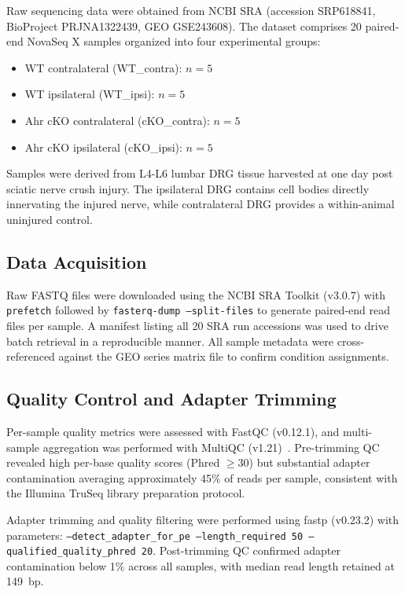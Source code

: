 \documentclass[conference]{IEEEtran}
\begin{document}
Raw sequencing data were obtained from NCBI SRA (accession SRP618841, BioProject PRJNA1322439, GEO GSE243608). The dataset comprises 20 paired-end NovaSeq X samples organized into four experimental groups:

\begin{itemize}
  \item WT contralateral (WT\_contra): $n = 5$
  \item WT ipsilateral (WT\_ipsi): $n = 5$
  \item Ahr cKO contralateral (cKO\_contra): $n = 5$
  \item Ahr cKO ipsilateral (cKO\_ipsi): $n = 5$
\end{itemize}

Samples were derived from L4-L6 lumbar DRG tissue harvested at one day post sciatic nerve crush injury. The ipsilateral DRG contains cell bodies directly innervating the injured nerve, while contralateral DRG provides a within-animal uninjured control.

\subsection{Data Acquisition}

Raw FASTQ files were downloaded using the NCBI SRA Toolkit (v3.0.7) with \texttt{prefetch} followed by \texttt{fasterq-dump --split-files} to generate paired-end read files per sample. A manifest listing all 20 SRA run accessions was used to drive batch retrieval in a reproducible manner. All sample metadata were cross-referenced against the GEO series matrix file to confirm condition assignments.

\subsection{Quality Control and Adapter Trimming}

Per-sample quality metrics were assessed with FastQC (v0.12.1), and multi-sample aggregation was performed with MultiQC (v1.21)~\cite{ewels2016}. Pre-trimming QC revealed high per-base quality scores (Phred $\geq 30$) but substantial adapter contamination averaging approximately 45\% of reads per sample, consistent with the Illumina TruSeq library preparation protocol.

Adapter trimming and quality filtering were performed using fastp (v0.23.2) with parameters: \texttt{--detect\_adapter\_for\_pe --length\_required 50 --qualified\_quality\_phred 20}. Post-trimming QC confirmed adapter contamination below 1\% across all samples, with median read length retained at 149~bp.
\end{document}
